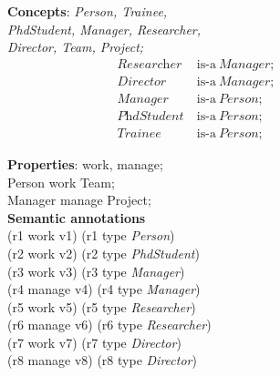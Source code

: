 \begin{figure}[t!]
	\begin{minipage}[t]{0.45\textwidth}
			\textbf{Concepts}: \textit{Person, Trainee,\\
			PhdStudent, Manager, Researcher,\\
			Director, Team,
			Project;}
			\begin{align}
			\textit{Researcher}\ &\text{is-a}\ \textit{Manager};&\\
			\textit{Director}\ &\text{is-a}\ \textit{Manager};&\\
			\textit{Manager}\ &\text{is-a}\ \textit{Person};&\\
			\textit{PhdStudent}\ &\text{is-a}\ \textit{Person};&\\
			\textit{Trainee}\ &\text{is-a}\ \textit{Person};&
			\end{align}
			
			\textbf{Properties}: work, manage;\\
			Person work Team;\\
			Manager manage Project;\\

		\textbf{Semantic annotations}\\
			(r1 work v1) (r1 type \textit{Person})\\
			(r2 work v2) (r2 type \textit{PhdStudent})\\
			(r3 work v3) (r3 type \textit{Manager})\\
			(r4 manage v4) (r4 type \textit{Manager})\\
			(r5 work v5) (r5 type \textit{Researcher})\\
			(r6 manage v6) (r6 type \textit{Researcher})\\
			(r7 work v7) (r7 type \textit{Director})\\
			(r8 manage v8) (r8 type \textit{Director})\\

	\end{minipage}
	\hspace{0.05\textwidth}
	\begin{minipage}[t]{0.45\textwidth}
		

\end{minipage}
\end{figure}
